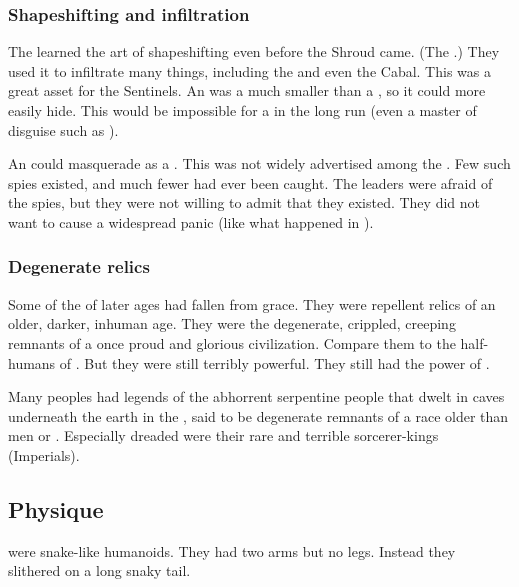 \subsubsection{Shapeshifting and infiltration}
The \ophidians learned the art of shapeshifting even before the Shroud came. 
(The \dragons {}.)
They used it to infiltrate many things, including the \aryothim and even the Cabal. 
This was a great asset for the Sentinels. 
An \ophidian was a much smaller \vertex than a \dragon, so it could more easily hide.
This would be impossible for a \dragon in the long run (even a master of disguise such as \Nzessuacrith). 

An \ophidian could masquerade as a \bezed. 
This was not widely advertised among the \resphain.
Few such spies existed, and much fewer had ever been caught. 
The \resphan leaders were afraid of the spies, but they were not willing to admit that they existed.
They did not want to cause a widespread panic (like what happened in \cite{TV:BattlestarGalactica}).





\subsubsection{Degenerate relics}
Some of the \ophidian {} of later ages had fallen from grace.
They were repellent relics of an older, darker, inhuman age. 
They were the degenerate, crippled, creeping remnants of a once proud and glorious civilization. 
Compare them to the half-humans of \cite{RobertEHoward:WormsoftheEarth}. 
But they were still terribly powerful.
They still had the power of . 

Many peoples had legends of the abhorrent serpentine people that dwelt in caves underneath the earth in the \wylde, said to be degenerate remnants of a race older than men or \scathae. 
Especially dreaded were their rare and terrible sorcerer-kings (Imperials).









\subsection{Physique}
\Ophidians were snake-like humanoids. 
They had two arms but no legs. 
Instead they slithered on a long snaky tail. 

